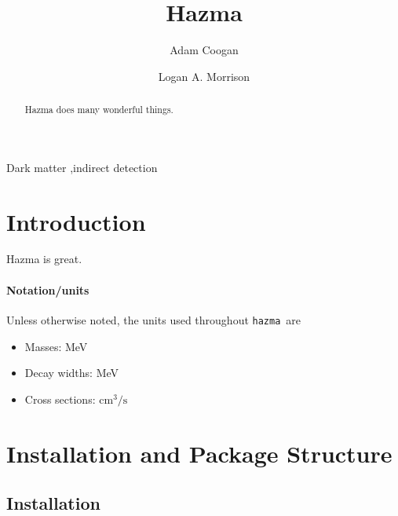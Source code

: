\documentclass[review]{elsarticle}
\newcommand{\mil}[1]{\texttt{#1}}
\renewcommand\u[1]{{\mathrm{#1}}}
\newcommand{\hazma}{\mil{hazma}}
\begin{document}
\begin{frontmatter}

	\title{Hazma}

	\author[grappa,ucsc,scipp]{Adam Coogan}

	\author[ucsc,scipp]{Logan A. Morrison}

	\address[grappa]{GRAPPA, Institute of Physics, University of Amsterdam, 1098 XH Amsterdam, The Netherlands}
	\address[ucsc]{Department of Physics, 1156 High St., University of California Santa Cruz, Santa Cruz, CA 95064, USA}
	\address[scipp]{Santa Cruz Institute for Particle Physics, 1156 High St., Santa Cruz, CA 95064, USA}

	\begin{abstract}
		Hazma does many wonderful things.
	\end{abstract}

	\begin{keyword}
		Dark matter \sep indirect detection
	\end{keyword}

\end{frontmatter}

\section{Introduction}

Hazma is great.

\paragraph{Notation/units} Unless otherwise noted, the units used throughout \hazma\ are
\begin{itemize}
    \item Masses: MeV
    \item Decay widths: MeV
    \item Cross sections: $\u{cm}^3 / \u{s}$
\end{itemize}

\section{Installation and Package Structure}%
\label{sec:installation}

\subsection{Installation}
\end{document}
